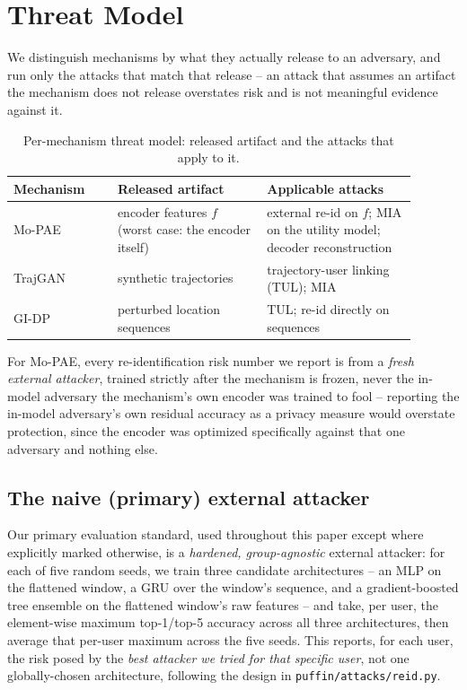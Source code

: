 \section{Threat Model}
\label{sec:threat-model}

We distinguish mechanisms by what they actually release to an
adversary, and run only the attacks that match that release -- an
attack that assumes an artifact the mechanism does not release
overstates risk and is not meaningful evidence against it.

\begin{table}[h]
\centering
\caption{Per-mechanism threat model: released artifact and the attacks
that apply to it.}
\label{tab:threat-model}
\small
\begin{tabular}{@{}p{0.23\linewidth}p{0.33\linewidth}p{0.33\linewidth}@{}}
\toprule
Mechanism & Released artifact & Applicable attacks \\
\midrule
Mo-PAE & encoder features $f$ (worst case: the encoder itself) &
  external re-id on $f$; MIA on the utility model; decoder
  reconstruction \\
TrajGAN & synthetic trajectories & trajectory-user linking (TUL); MIA \\
GI-DP & perturbed location sequences & TUL; re-id directly on
  sequences \\
\bottomrule
\end{tabular}
\end{table}

For Mo-PAE, every re-identification risk number we report is from a
\emph{fresh external attacker}, trained strictly after the mechanism
is frozen, never the in-model adversary the mechanism's own encoder was
trained to fool -- reporting the in-model adversary's own residual
accuracy as a privacy measure would overstate protection, since the
encoder was optimized specifically against that one adversary and
nothing else.

\subsection{The naive (primary) external attacker}
\label{sec:threat-model-naive}

Our primary evaluation standard, used throughout this paper except
where explicitly marked otherwise, is a \emph{hardened, group-agnostic}
external attacker: for each of five random seeds, we train three
candidate architectures -- an MLP on the flattened window, a GRU over
the window's sequence, and a gradient-boosted tree ensemble on the
flattened window's raw features -- and take, per user, the
element-wise maximum top-1/top-5 accuracy across all three
architectures, then average that per-user maximum across the five
seeds. This reports, for each user, the risk posed by the \emph{best
attacker we tried for that specific user}, not one globally-chosen
architecture, following the design in \texttt{puffin/attacks/reid.py}.

